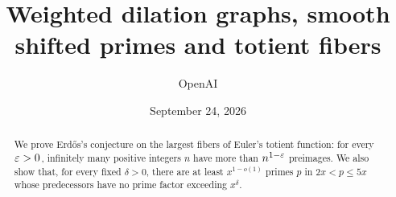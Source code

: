\documentclass[11pt,letterpaper]{article}
\title{Weighted dilation graphs, smooth shifted primes and totient fibers}
\author{OpenAI}
\date{September 24, 2026}
\begin{document}
\maketitle
\begin{abstract}
We prove Erd\H{o}s's conjecture on the largest fibers of Euler's totient function: for every $\varepsilon>0$, infinitely many positive integers $n$ have more than $n^{1-\varepsilon}$ preimages. We also show that, for every fixed $\delta>0$, there are at least $x^{1-o(1)}$ primes $p$ in $2x<p\le5x$ whose predecessors have no prime factor exceeding $x^\delta$.
\end{abstract}

\tableofcontents







{}

\begingroup
\raggedright

\endgroup
\end{document}
